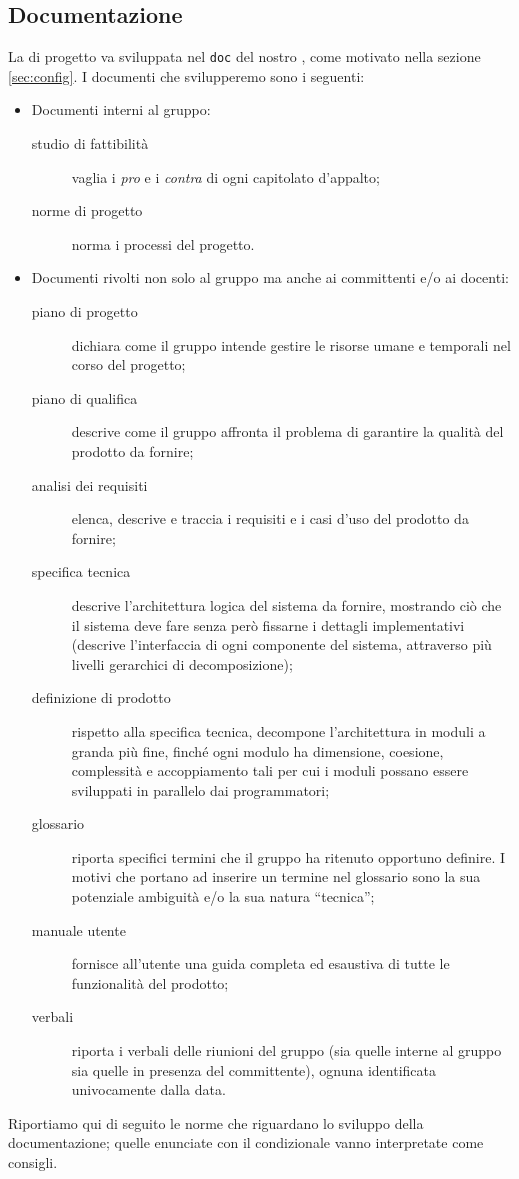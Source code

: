 \subsection{Documentazione}
La  di progetto va sviluppata nel  \texttt{doc} del nostro , come motivato nella sezione \ref{sec:config}. I documenti che svilupperemo sono i seguenti:
\begin{itemize}
	\item Documenti interni al gruppo:
	\begin{description}
		\item[studio di fattibilità] vaglia i \emph{pro} e i \emph{contra} di ogni capitolato d'appalto;
		\item[norme di progetto] norma i processi del progetto.
	\end{description}
	\item Documenti rivolti non solo al gruppo ma anche ai committenti e/o ai docenti:
	\begin{description}
		\item[piano di progetto] dichiara come il gruppo intende gestire le risorse umane e temporali nel corso del progetto;
		\item[piano di qualifica] descrive come il gruppo affronta il problema di garantire la qualità del prodotto da fornire;
		\item[analisi dei requisiti] elenca, descrive e traccia i requisiti e i casi d'uso del prodotto da fornire;
		\item[specifica tecnica] descrive l'architettura logica del sistema da fornire, mostrando ciò che il sistema deve fare senza però fissarne i dettagli implementativi (descrive l'interfaccia di ogni componente del sistema, attraverso più livelli gerarchici di decomposizione);
		\item[definizione di prodotto] rispetto alla specifica tecnica, decompone l'architettura in moduli a granda più fine, finché ogni modulo ha dimensione, coesione, complessità e accoppiamento tali per cui i moduli possano essere sviluppati in parallelo dai programmatori;
		\item[glossario] riporta specifici termini che il gruppo ha ritenuto opportuno definire. I motivi che portano ad inserire un termine nel glossario sono la sua potenziale ambiguità e/o la sua natura “tecnica”;
		\item[manuale utente] fornisce all'utente una guida completa ed esaustiva di tutte le funzionalità del prodotto;
		\item[verbali] riporta i verbali delle riunioni del gruppo (sia quelle interne al gruppo sia quelle in presenza del committente), ognuna identificata univocamente dalla data.
	\end{description}
\end{itemize}
Riportiamo qui di seguito le norme che riguardano lo sviluppo della documentazione; quelle enunciate con il condizionale vanno interpretate come consigli.

